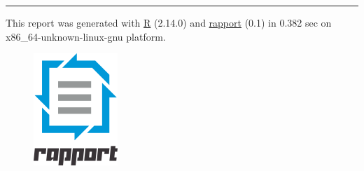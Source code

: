 \documentclass[]{article}
\makeatletter
\def\maxwidth{\ifdim\Gin@nat@width>\linewidth\linewidth
\else\Gin@nat@width\fi}
\let\Oldincludegraphics\includegraphics
\renewcommand{\includegraphics}[1]{\Oldincludegraphics[width=\maxwidth]{#1}}
\makeatother
\begin{document}
\begin{center}\rule{3in}{0.4pt}\end{center}

This report was generated with \href{http://www.r-project.org/}{R}
(2.14.0) and \href{http://al3xa.github.com/rapport/}{rapport} (0.1) in
0.382 sec on x86\_64-unknown-linux-gnu platform.

\begin{figure}[htbp]
\centering
\includegraphics{images/logo.png}
\caption{}
\end{figure}
\end{document}
